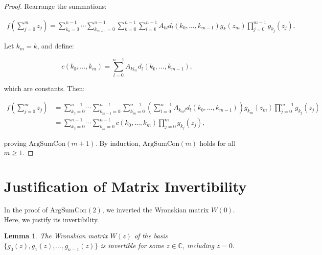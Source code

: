 \documentclass{article}
\newtheorem{lemma}[theorem]{Lemma}
\begin{document}
\begin{proof}
		Rearrange the summations:
		
		\begin{align}
			f\left( \sum_{j=0}^{m} z_j \right) = \sum_{k_0=0}^{n-1} \cdots \sum_{k_{m-1}=0}^{n-1} \sum_{k=0}^{n-1} \sum_{l=0}^{n-1} A_{kl} d_l(k_0, \ldots, k_{m-1}) g_k(z_m) \prod_{j=0}^{m-1} g_{k_j}(z_j).
		\end{align}
		
		Let \(k_m = k\), and define:
		
		\begin{equation}
			c(k_0, \ldots, k_m) = \sum_{l=0}^{n-1} A_{kl_m} d_l(k_0, \ldots, k_{m-1}),
		\end{equation}
		
		which are constants. Then:
		
		\begin{align}
			f\left( \sum_{j=0}^{m} z_j \right) &= \sum_{k_0=0}^{n-1} \cdots \sum_{k_{m-1}=0}^{n-1} \sum_{k_m=0}^{n-1} \left( \sum_{l=0}^{n-1} A_{k_m l} d_l(k_0, \ldots, k_{m-1}) \right) g_{k_m}(z_m) \prod_{j=0}^{m-1} g_{k_j}(z_j) \\
			&= \sum_{k_0=0}^{n-1} \cdots \sum_{k_m=0}^{n-1} c(k_0, \ldots, k_m) \prod_{j=0}^{m} g_{k_j}(z_j),
		\end{align}
		
		proving \(\text{ArgSumCon}(m+1)\). By induction, \(\text{ArgSumCon}(m)\) holds for all \(m \geq 1\).
	\end{proof}
	
	\section{Justification of Matrix Invertibility}
	
	In the proof of \(\text{ArgSumCon}(2)\), we inverted the Wronskian matrix \(W(0)\). Here, we justify its invertibility.
	
	\begin{lemma}
		The Wronskian matrix \(W(z)\) of the basis \(\{g_0(z), g_1(z), \ldots, g_{n-1}(z)\}\) is invertible for some \(z \in \mathbb{C}\), including \(z = 0\).
	\end{lemma}
	
\end{document}
